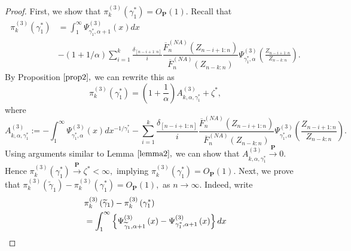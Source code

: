 \documentclass[reqno,openbib,runningheads,a4paper,12pt]{amsart}%
\begin{document}
\begin{proof}
First, we show that\textbf{ }$\pi_{k}^{\left(  3\right)  }\left(  \gamma
_{1}^{\ast}\right)  =O_{\mathbf{P}}\left(  1\right)  .$\textbf{ }Recall
that\textbf{ }%
\begin{align*}
\pi_{k}^{\left(  3\right)  }\left(  \gamma_{1}^{\ast}\right)   &  =\int%
_{1}^{\infty}\Psi_{\gamma_{1}^{\ast},\alpha+1}^{\left(  3\right)  }\left(
x\right)  dx\\
&  -\left(  1+1/\alpha\right)  \sum_{i=1}^{k}\frac{\delta_{\left[
n-i+1:n\right]  }}{i}\dfrac{\overline{F}_{n}^{\left(  NA\right)  }\left(
Z_{n-i+1:n}\right)  }{\overline{F}_{n}^{\left(  NA\right)  }\left(
Z_{n-k:n}\right)  }\Psi_{\gamma_{1}^{\ast},\alpha}^{\left(  3\right)  }\left(
\frac{Z_{n-i+1:n}}{Z_{n-k:n}}\right)  .
\end{align*}
By Proposition\textbf{ }$\ref{prop2},$\textbf{ }we can rewrite this as\textbf{
}%
\[
\pi_{k}^{\left(  3\right)  }\left(  \gamma_{1}^{\ast}\right)  =\left(
1+\frac{1}{\alpha}\right)  A_{k,\alpha,\gamma_{1}^{\ast}}^{\left(  3\right)
}+\zeta^{\ast},
\]
where\textbf{ }%
\[
A_{k,\alpha,\gamma_{1}^{\ast}}^{\left(  3\right)  }:=-\int_{1}^{\infty}%
\Psi_{\gamma_{1}^{\ast},\alpha}^{\left(  3\right)  }\left(  x\right)
dx^{-1/\gamma_{1}^{\ast}}-\sum_{i=1}^{k}\frac{\delta_{\left[  n-i+1:n\right]
}}{i}\dfrac{\overline{F}_{n}^{\left(  NA\right)  }\left(  Z_{n-i+1:n}\right)
}{\overline{F}_{n}^{\left(  NA\right)  }\left(  Z_{n-k:n}\right)  }%
\Psi_{\gamma_{1}^{\ast},\alpha}^{\left(  3\right)  }\left(  \frac{Z_{n-i+1:n}%
}{Z_{n-k:n}}\right)  .
\]
Using arguments similar to Lemma $\ref{lemma2},$ we can show that
$A_{k,\alpha,\gamma_{1}^{\ast}}^{\left(  3\right)  }\overset{\mathbf{P}%
}{\rightarrow}0.$ Hence $\pi_{k}^{\left(  3\right)  }\left(  \gamma_{1}^{\ast
}\right)  \overset{\mathbf{P}}{\rightarrow}\zeta^{\ast}<\infty,$ implying
$\pi_{k}^{\left(  3\right)  }\left(  \gamma_{1}^{\ast}\right)  =O_{\mathbf{P}%
}\left(  1\right)  .$ Next, we prove that $\pi_{k}^{\left(  3\right)  }\left(
\widetilde{\gamma}_{1}\right)  -\pi_{k}^{\left(  3\right)  }\left(  \gamma
_{1}^{\ast}\right)  =O_{\mathbf{P}}\left(  1\right)  ,$ as $n\rightarrow
\infty.$ Indeed, write
\begin{align*}
&  \pi_{k}^{\left(  3\right)  }\left(  \widetilde{\gamma}_{1}\right)  -\pi
_{k}^{\left(  3\right)  }\left(  \gamma_{1}^{\ast}\right)  \medskip\\
&  =\int_{1}^{\infty}\left\{  \Psi_{\widetilde{\gamma}_{1},\alpha+1}^{\left(
3\right)  }\left(  x\right)  -\Psi_{\gamma_{1}^{\ast},\alpha+1}^{\left(
3\right)  }\left(  x\right)  \right\}  dx\medskip\\

\end{align*}
\end{proof}
\end{document}
